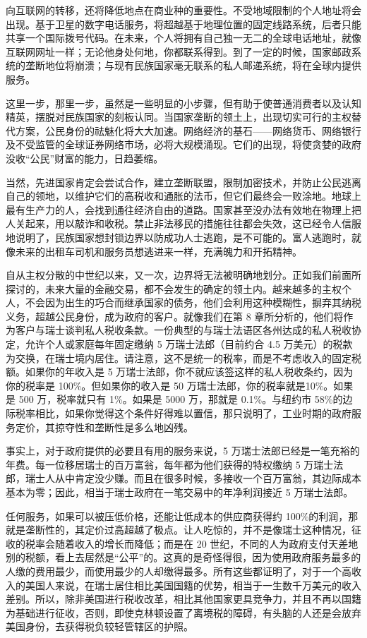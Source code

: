 向互联网的转移，还将降低地点在商业种的重要性。不受地域限制的个人地址将会出现。基于卫星的数字电话服务，将超越基于地理位置的固定线路系统，后者只能共享一个国际拨号代码。在未来，个人将拥有自己独一无二的全球电话地址，就像互联网网址一样；无论他身处何地，你都联系得到。到了一定的时候，国家邮政系统的垄断地位将崩溃；与现有民族国家毫无联系的私人邮递系统，将在全球内提供服务。

这里一步，那里一步，虽然是一些明显的小步骤，但有助于使普通消费者以及认知精英，摆脱对民族国家的刻板认同。当国家垄断的领土上，出现切实可行的主权替代方案，公民身份的祛魅化将大大加速。网络经济的基石——网络货币、网络银行及不受监管的全球证券网络市场，必将大规模涌现。它们的出现，将使贪婪的政府没收“公民”财富的能力，日趋萎缩。

当然，先进国家肯定会尝试合作，建立垄断联盟，限制加密技术，并防止公民逃离自己的领地，以维护它们的高税收和通胀的法币，但它们最终会一败涂地。地球上最有生产力的人，会找到通往经济自由的道路。国家甚至没办法有效地在物理上把人关起来，用以敲诈和收税。禁止非法移民的措施往往都会失效，这已经令人信服地说明了，民族国家想封锁边界以防成功人士逃跑，是不可能的。富人逃跑时，就像未来的出租车司机和服务员想逃进来一样，充满魄力和开拓精神。

自从主权分散的中世纪以来，又一次，边界将无法被明确地划分。正如我们前面所探讨的，未来大量的金融交易，都不会发生的确定的领土内。越来越多的主权个人，不会因为出生的巧合而继承国家的债务，他们会利用这种模糊性，摒弃其纳税义务，超越公民身份，成为政府的客户。就像我们在第 8 章所分析的，他们将作为客户与瑞士谈判私人税收条款。一份典型的与瑞士法语区各州达成的私人税收协定，允许个人或家庭每年固定缴纳 5 万瑞士法郎（目前约合 4.5 万美元）的税款为交换，在瑞士境内居住。请注意，这不是统一的税率，而是不考虑收入的固定税额。如果你的年收入是 5 万瑞士法郎，你不就应该签这样的私人税收条约，因为你的税率是 100\%。但如果你的收入是 50 万瑞士法郎，你的税率就是10\%。如果是 500 万，税率就只有 1\%。如果是 5000 万，那就是 0.1\%。与纽约市 58\%的边际税率相比，如果你觉得这个条件好得难以置信，那只说明了，工业时期的政府服务定价，其掠夺性和垄断性是多么地凶残。

事实上，对于政府提供的必要且有用的服务来说，5 万瑞士法郎已经是一笔充裕的年费。每一位移居瑞士的百万富翁，每年都为他们获得的特权缴纳 5 万瑞士法郎，瑞士人从中肯定没少赚。而且在很多时候，多接收一个百万富翁，其边际成本基本为零；因此，相当于瑞士政府在一笔交易中的年净利润接近 5 万瑞士法郎。

任何服务，如果可以被压低价格，还能让低成本的供应商获得约 100\%的利润，那就是垄断性的，其定价过高超越了极点。让人吃惊的，并不是像瑞士这种情况，征收的税率会随着收入的增长而降低；而是在 20 世纪，不同的人为政府支付天差地别的税额，看上去居然是“公平”的。这真的是奇怪得很，因为使用政府服务最多的人缴的费用最少，而使用最少的人却缴得最多。所有这些都证明了，对于一个高收入的美国人来说，在瑞士居住相比美国国籍的优势，相当于一生数千万美元的收入差别。所以，除非美国进行税收改革，相比其他国家更具竞争力，并且不再以国籍为基础进行征收，否则，即使克林顿设置了离境税的障碍，有头脑的人还是会放弃美国身份，去获得税负较轻管辖区的护照。

